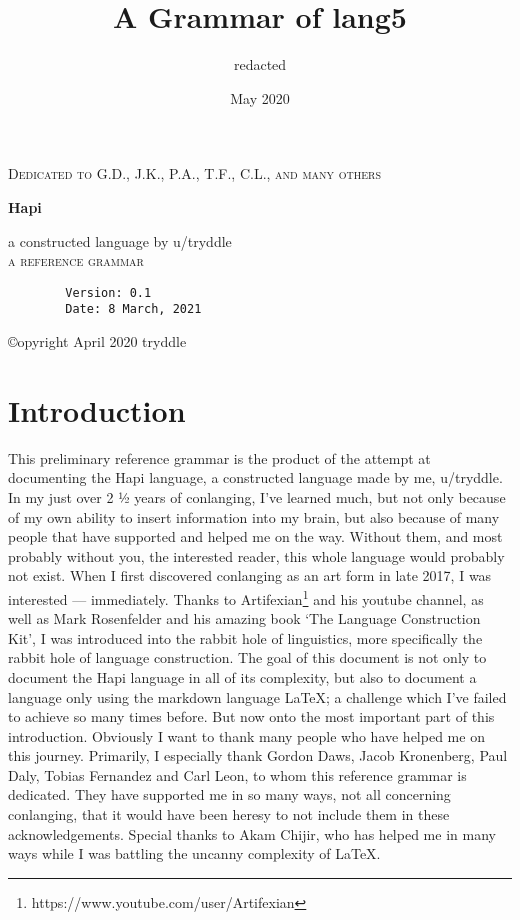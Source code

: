 \documentclass[a4paper, 12pt, oneside]{memoir}
\title{A Grammar of lang5}
\author{redacted}
\date{May 2020}
\makeatletter
\newlength\drop
\newcommand*\titleM{\begingroup%
\setlength\drop{0.08\textheight}
\centering
{\scshape Dedicated to G.D., J.K., P.A., T.F., C.L., and many others\par}
\vspace*{\drop}
   
\vspace*{\drop}
\begin{flushleft}
{\HUGE\bfseries Hapi}\\
\end{flushleft}
\vspace*{\drop}
\vspace*{\drop}
\begin{flushright}
{\LARGE a constructed language by u/tryddle}\\[\baselineskip]
{\scshape a reference grammar}\\[\baselineskip]
{\scshape \@date}\par
\end{flushright}


\endgroup}
\makeatother
\begin{document}
\begin{titlingpage}
\titleM{}
\end{titlingpage}
\pagebreak
{}

\vspace*{\fill}

\begin{center}
    \begin{verbatim}
        Version: 0.1
        Date: 8 March, 2021
    \end{verbatim}
    ©opyright April 2020 tryddle
\end{center}

\vspace*{\fill}

\restoregeometry

\pagebreak
\setcounter{tocdepth}{4}
\tableofcontents
\newpage 
\listoffigures
\listoftables
\newpage
\printglossaries
\newpage

\chapter{Introduction}
This preliminary reference grammar is the product of the attempt at documenting the Hapi language, a constructed language made by me, u/tryddle. In my just over 2 ½ years of conlanging, I've learned much, but not only because of my own ability to insert information into my brain, but also because of many people that have supported and helped me on the way. Without them, and most probably without you, the interested reader, this whole language would probably not exist. When I first discovered conlanging as an art form in late 2017, I was interested — immediately. Thanks to Artifexian\footnote{https://www.youtube.com/user/Artifexian} and his youtube channel, as well as Mark Rosenfelder and his amazing book `The Language Construction Kit', I was introduced into the rabbit hole of linguistics, more specifically the rabbit hole of language construction. 
The goal of this document is not only to document the Hapi language in all of its complexity, but also to document a language only using the markdown language \LaTeX; a challenge which I've failed to achieve so many times before. 
But now onto the most important part of this introduction. Obviously I want to thank many people who have helped me on this journey. Primarily, I especially thank Gordon Daws, Jacob Kronenberg, Paul Daly, Tobias Fernandez and Carl Leon, to whom this reference grammar is dedicated. They have supported me in so many ways, not all concerning conlanging, that it would have been heresy to not include them in these acknowledgements. Special thanks to Akam Chijir, who has helped me in many ways while I was battling the uncanny complexity of \LaTeX.
\end{document}
